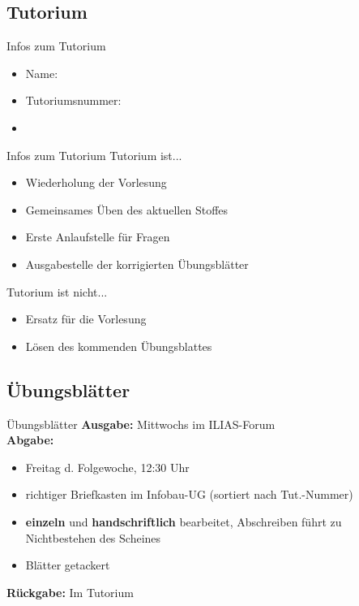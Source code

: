 \subsection{Tutorium}

	\aboutMeFrame



	\begin{frame}{Infos zum Tutorium}
		\begin{itemize}
			\item Name: \myname
			\item Tutoriumsnummer: \mytutnumber
			\item \mytutinfos
		\end{itemize}	
	\end{frame}

	\begin{frame}{Infos zum Tutorium}
		Tutorium ist...\\
		\begin{itemize}
			\item Wiederholung der Vorlesung
			\item Gemeinsames Üben des aktuellen Stoffes
			\item Erste Anlaufstelle für Fragen
			\item Ausgabestelle der korrigierten Übungsblätter
		\end{itemize}
		\pause
		Tutorium ist nicht...\\
		\begin{itemize}
			\item Ersatz für die Vorlesung
			\item Lösen des kommenden Übungsblattes
		\end{itemize}
	\end{frame}
	
	
\subsection{Übungsblätter}
	\begin{frame}{Übungsblätter}
		\textbf{Ausgabe:} Mittwochs im ILIAS-Forum \\
		\pause
		\textbf{Abgabe:}
			\begin{itemize}
				\item Freitag d. Folgewoche, 12:30 Uhr
				\item richtiger Briefkasten im Infobau-UG (sortiert nach Tut.-Nummer)
				\pause
				\item \textbf{einzeln} und \textbf{handschriftlich} bearbeitet, Abschreiben führt zu Nichtbestehen des Scheines
				\item Blätter getackert
			\end{itemize}
		\pause	
		\textbf{Rückgabe:} Im Tutorium
	\end{frame}
